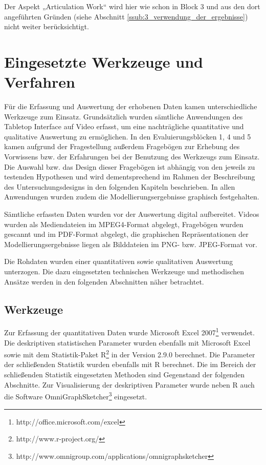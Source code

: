 Der Aspekt „Articulation Work“ wird hier wie schon in Block 3 und aus den dort angeführten Gründen (siehe Abschnitt \ref{ssub:3_verwendung_der_ergebnisse}) nicht weiter berücksichtigt.


\section{Eingesetzte Werkzeuge und Verfahren} %
\label{sec:eingesetzte_werkzeuge_und_verfahren}

Für die Erfassung und Auswertung der erhobenen Daten kamen unterschiedliche Werkzeuge zum Einsatz. Grundsätzlich wurden sämtliche Anwendungen des Tabletop Interface auf Video erfasst, um eine nachträgliche quantitative und qualitative Auswertung zu ermöglichen. In den Evaluierungsblöcken 1, 4 und 5 kamen aufgrund der Fragestellung außerdem Fragebögen zur Erhebung des Vorwissens bzw. der Erfahrungen bei der Benutzung des Werkzeugs zum Einsatz. Die Auswahl bzw. das Design dieser Fragebögen ist abhängig von den jeweils zu testenden Hypothesen und wird dementsprechend im Rahmen der Beschreibung des Untersuchungsdesigns in den folgenden Kapiteln beschrieben. In allen Anwendungen wurden zudem die Modellierungsergebnisse graphisch festgehalten.

Sämtliche erfassten Daten wurden vor der Auswertung digital aufbereitet. Videos wurden als Mediendateien im MPEG4-Format abgelegt, Fragebögen wurden gescannt und im PDF-Format abgelegt, die graphischen Repräsentationen der Modellierungsergebnisse liegen als Bilddateien im PNG- bzw. JPEG-Format vor.

Die Rohdaten wurden einer quantitativen sowie qualitativen Auswertung unterzogen. Die dazu eingesetzten technischen Werkzeuge und methodischen Ansätze werden in den folgenden Abschnitten näher betrachtet.

\subsection{Werkzeuge} %
\label{sub:werkzeuge}

Zur Erfassung der quantitativen Daten wurde Microsoft Excel 2007\footnote{http://office.microsoft.com/excel} verwendet. Die deskriptiven statistischen Parameter wurden ebenfalls mit Microsoft Excel sowie mit dem Statistik-Paket R\footnote{http://www.r-project.org/} in der Version 2.9.0 berechnet. Die Parameter der schließenden Statistik wurden ebenfalls mit R berechnet. Die im Bereich der schließenden Statistik eingesetzten Methoden sind Gegenstand der folgenden Abschnitte. Zur Visualisierung der deskriptiven Parameter wurde neben R auch die Software OmniGraphSketcher\footnote{http://www.omnigroup.com/applications/omnigraphsketcher} eingesetzt.


